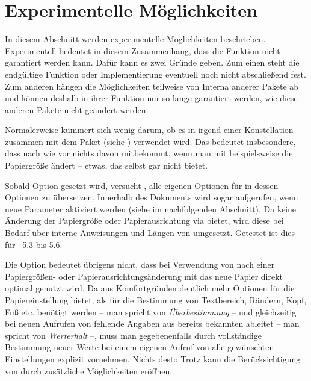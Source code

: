 \section{Experimentelle Möglichkeiten}

In diesem Abschnitt werden experimentelle Möglichkeiten
beschrieben. Experimentell bedeutet in diesem Zusammenhang, dass die Funktion
nicht garantiert werden kann. Dafür kann es zwei Gründe geben. Zum einen
steht die endgültige Funktion oder Implementierung eventuell noch nicht
abschließend fest. Zum anderen hängen die Möglichkeiten teilweise von Interna
anderer Pakete ab und können deshalb in ihrer Funktion nur so lange garantiert
werden, wie diese anderen Pakete nicht geändert werden.

\begin{Declaration}
\end{Declaration}
Normalerweise kümmert sich  wenig darum, ob es in irgend
einer Konstellation zusammen mit dem Paket
 (siehe \cite{package:geometry})
verwendet wird. Das bedeutet insbesondere, dass  nach wie
vor nichts davon mitbekommt, wenn man mit  beispielsweise
die Papiergröße ändert -- etwas, das  selbst gar nicht
bietet.

Sobald Option 
gesetzt wird, versucht , alle eigenen Optionen für
 in dessen Optionen zu übersetzen. Innerhalb des Dokuments
wird sogar  aufgerufen, wenn neue Parameter aktiviert
werden (siehe  im nachfolgenden
Abschnitt). Da  keine Änderung der Papiergröße oder
Papierausrichtung via  bietet, wird diese bei Bedarf über
interne Anweisungen und Längen von  umgesetzt. Getestet ist
dies für ~5.3 bis 5.6.

Die Option bedeutet übrigens nicht, dass bei Verwendung von 
nach einer Papiergrößen- oder Papierausrichtungsänderung mit
 das neue Papier direkt optimal genutzt wird. Da
 aus Komfortgründen deutlich mehr Optionen für die
Papiereinstellung bietet, als für die Bestimmung von Textbereich, Rändern,
Kopf, Fuß etc. benötigt werden -- man spricht von \emph{Überbestimmung} -- und
gleichzeitig bei neuen Aufrufen von  fehlende Angaben aus
bereits bekannten ableitet -- man spricht von \emph{Werterhalt} --,
muss man gegebenenfalls durch vollständige Bestimmung neuer Werte
bei einem eigenen Aufruf von  alle gewünschten
Einstellungen explizit vornehmen. Nichts desto Trotz kann die Berücksichtigung
von  durch  zusätzliche Möglichkeiten
eröffnen.


